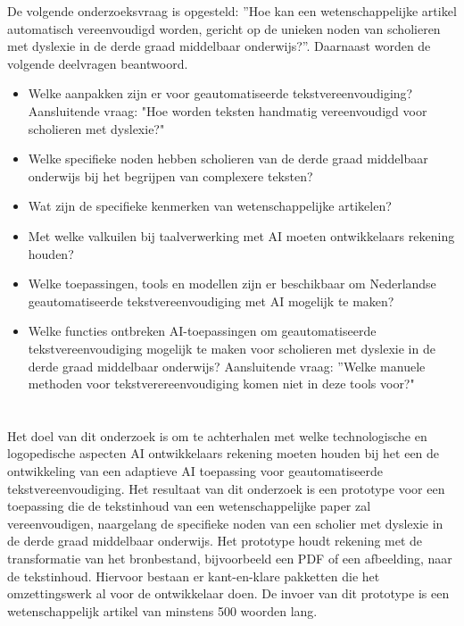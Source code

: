 De volgende onderzoeksvraag is opgesteld: ”Hoe kan een wetenschappelijke artikel automatisch vereenvoudigd worden, gericht op de unieken noden van scholieren met dyslexie in de derde graad middelbaar onderwijs?”. Daarnaast worden de volgende deelvragen beantwoord.

\begin{itemize}
\item Welke aanpakken zijn er voor geautomatiseerde tekstvereenvoudiging? Aansluitende vraag: "Hoe worden teksten handmatig vereenvoudigd voor scholieren met dyslexie?"
\item Welke specifieke noden hebben scholieren van de derde graad middelbaar onderwijs bij het begrijpen van complexere teksten?
\item Wat zijn de specifieke kenmerken van wetenschappelijke artikelen?
\item Met welke valkuilen bij taalverwerking met AI moeten ontwikkelaars rekening houden?
\item Welke toepassingen, tools en modellen zijn er beschikbaar om Nederlandse geautomatiseerde tekstvereenvoudiging met AI mogelijk te maken?
\item Welke functies ontbreken AI-toepassingen om geautomatiseerde tekstvereenvoudiging mogelijk te maken voor scholieren met dyslexie in de derde graad middelbaar onderwijs? Aansluitende vraag: ”Welke manuele methoden voor tekstverereenvoudiging komen niet in deze tools voor?"
\end{itemize}


\section{}%
\label{sec:onderzoeksdoelstelling}


Het doel van dit onderzoek is om te achterhalen met welke technologische en logopedische aspecten AI ontwikkelaars rekening moeten houden bij het een de ontwikkeling van een adaptieve AI toepassing voor geautomatiseerde tekstvereenvoudiging. Het resultaat van dit onderzoek is een prototype voor een toepassing die de tekstinhoud van een wetenschappelijke paper zal vereenvoudigen, naargelang de specifieke noden van een scholier met dyslexie in de derde graad middelbaar onderwijs. Het prototype houdt rekening met de transformatie van het bronbestand, bijvoorbeeld een PDF of een afbeelding, naar de tekstinhoud. Hiervoor bestaan er kant-en-klare pakketten die het omzettingswerk al voor de ontwikkelaar doen. De invoer van dit prototype is een wetenschappelijk artikel van minstens 500 woorden lang.

